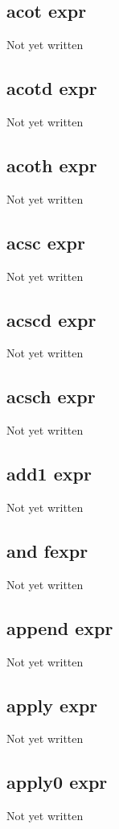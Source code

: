 \documentclass[a4paper,11pt]{article}
\begin{document}
\subsection{\ttfamily acot expr}
Not yet written

\subsection{\ttfamily acotd expr}
Not yet written

\subsection{\ttfamily acoth expr}
Not yet written

\subsection{\ttfamily acsc expr}
Not yet written

\subsection{\ttfamily acscd expr}
Not yet written

\subsection{\ttfamily acsch expr}
Not yet written

\subsection{\ttfamily add1 expr}
Not yet written

\subsection{\ttfamily and fexpr}
Not yet written

\subsection{\ttfamily append expr}
Not yet written

\subsection{\ttfamily apply expr}
Not yet written

\subsection{\ttfamily apply0 expr}
Not yet written
\end{document}
